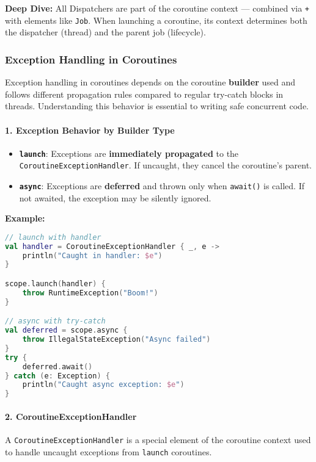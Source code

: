 \documentclass[a4paper,12pt]{article}
\begin{document}
\textbf{Deep Dive:}  
All Dispatchers are part of the coroutine context — combined via \texttt{+} with elements like \texttt{Job}. When launching a coroutine, its context determines both the dispatcher (thread) and the parent job (lifecycle).


\subsubsection{Exception Handling in Coroutines}

Exception handling in coroutines depends on the coroutine \textbf{builder} used and follows different propagation rules compared to regular try-catch blocks in threads. Understanding this behavior is essential to writing safe concurrent code.

\paragraph{1. Exception Behavior by Builder Type}
\begin{itemize}
  \item \texttt{\textbf{launch}}: Exceptions are \textbf{immediately propagated} to the \texttt{CoroutineExceptionHandler}. If uncaught, they cancel the coroutine’s parent.
  \item \texttt{\textbf{async}}: Exceptions are \textbf{deferred} and thrown only when \texttt{await()} is called. If not awaited, the exception may be silently ignored.
\end{itemize}

\textbf{Example:}
\begin{lstlisting}[language=Kotlin]
// launch with handler
val handler = CoroutineExceptionHandler { _, e -> 
    println("Caught in handler: $e")
}

scope.launch(handler) {
    throw RuntimeException("Boom!")
}

// async with try-catch
val deferred = scope.async {
    throw IllegalStateException("Async failed")
}
try {
    deferred.await()
} catch (e: Exception) {
    println("Caught async exception: $e")
}
\end{lstlisting}

\paragraph{2. CoroutineExceptionHandler}
A \texttt{CoroutineExceptionHandler} is a special element of the coroutine context used to handle uncaught exceptions from \texttt{launch} coroutines.
\end{document}
